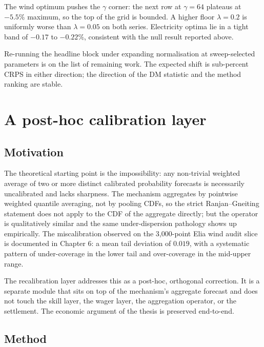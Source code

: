 \documentclass[
  11pt,
  a4paper,
  oneside]{report}
\begin{document}
The wind optimum pushes the \(\gamma\) corner: the next row at
\(\gamma = 64\) plateaus at \(-5.5\%\) maximum, so the top of the grid
is bounded. A higher floor \(\lambda = 0.2\) is uniformly worse than
\(\lambda = 0.05\) on both series. Electricity optima lie in a tight
band of \(-0.17\) to \(-0.22\%\), consistent with the null result
reported above.

Re-running the headline block under expanding normalisation at
sweep-selected parameters is on the list of remaining work. The expected
shift is sub-percent CRPS in either direction; the direction of the DM
statistic and the method ranking are stable.

\chapter{A post-hoc calibration layer}\label{ch:recalibration}

\section{Motivation}\label{motivation-1}

The theoretical starting point is the \citet{ranjan2010combining}
impossibility: any non-trivial weighted average of two or more distinct
calibrated probability forecasts is necessarily uncalibrated and lacks
sharpness. The mechanism aggregates by pointwise weighted quantile
averaging, not by pooling CDFs, so the strict Ranjan--Gneiting statement
does not apply to the CDF of the aggregate directly; but the operator is
qualitatively similar and the same under-dispersion pathology shows up
empirically. The miscalibration observed on the 3,000-point Elia wind
audit slice is documented in Chapter 6: a mean tail deviation of
\(0.019\), with a systematic pattern of under-coverage in the lower tail
and over-coverage in the mid-upper range.

The recalibration layer addresses this as a post-hoc, orthogonal
correction. It is a separate module that sits on top of the mechanism's
aggregate forecast and does not touch the skill layer, the wager layer,
the aggregation operator, or the settlement. The economic argument of
the thesis is preserved end-to-end.

\section{Method}\label{method}
\end{document}
